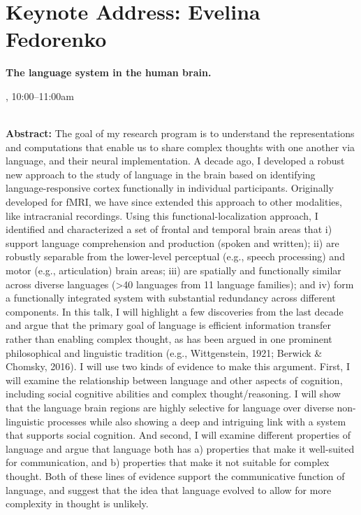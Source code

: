 \section{Keynote Address: Evelina Fedorenko}

\begin{center}
\begin{Large}
{\bfseries\Large The language system in the human brain.}
\vspace{1em}\par
\end{Large}

\daydateyear, 10:00--11:00am \vspace{1em}\\
\PlenaryLoc \\
\vspace{1em}\par
\end{center}

\noindent
{\bfseries Abstract:} The goal of my research program is to understand the representations and computations that enable us to share complex thoughts with one another via language, and their neural implementation. A decade ago, I developed a robust new approach to the study of language in the brain based on identifying language-responsive cortex functionally in individual participants. Originally developed for fMRI, we have since extended this approach to other modalities, like intracranial recordings. Using this functional-localization approach, I identified and characterized a set of frontal and temporal brain areas that i) support language comprehension and production (spoken and written); ii) are robustly separable from the lower-level perceptual (e.g., speech processing) and motor (e.g., articulation) brain areas; iii) are spatially and functionally similar across diverse languages (>40 languages from 11 language families); and iv) form a functionally integrated system with substantial redundancy across different components. In this talk, I will highlight a few discoveries from the last decade and argue that the primary goal of language is efficient information transfer rather than enabling complex thought, as has been argued in one prominent philosophical and linguistic tradition (e.g., Wittgenstein, 1921; Berwick & Chomsky, 2016). I will use two kinds of evidence to make this argument. First, I will examine the relationship between language and other aspects of cognition, including social cognitive abilities and complex thought/reasoning. I will show that the language brain regions are highly selective for language over diverse non-linguistic processes while also showing a deep and intriguing link with a system that supports social cognition. And second, I will examine different properties of language and argue that language both has a) properties that make it well-suited for communication, and b) properties that make it not suitable for complex thought. Both of these lines of evidence support the communicative function of language, and suggest that the idea that language evolved to allow for more complexity in thought is unlikely.

